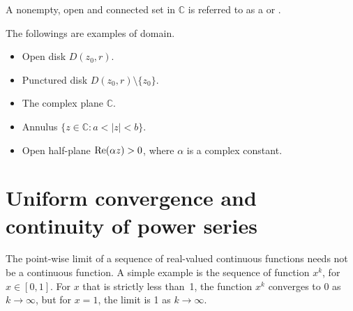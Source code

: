 \begin{svgraybox}
	\begin{definition} \label{def:domain}  
A nonempty, open and connected set in $\mathbb{C}$ is referred to as 
a  or .
	\end{definition}
\end{svgraybox}




The followings are examples of domain.
\begin{itemize}
	\item Open disk $D(z_0,r)$.
	\item Punctured disk $D(z_0,r)\setminus \{z_0\}$.
	\item The complex plane $\mathbb{C}$.
	\item Annulus $\{z\in\mathbb{C}: a< |z| < b\}$.
	\item Open half-plane $\operatorname{\mathrm{Re}}(\alpha z)>0$, where $\alpha$ is a complex constant.
\end{itemize}






\section{Uniform convergence and continuity of power series}


The point-wise limit of a sequence of real-valued continuous functions needs not be a continuous function. A simple example is the sequence of function $x^k$, for $x\in[0,1]$. For $x$ that is strictly less than~1, the function $x^k$ converges to 0 as $k\rightarrow \infty$, but for $x=1$, the limit is 1  as $k\rightarrow \infty$.





